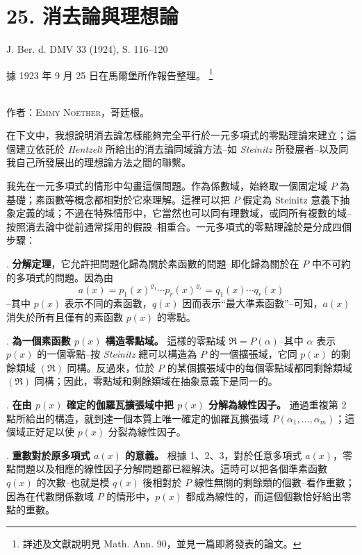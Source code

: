 \documentclass[11pt]{article}
\newcommand{\frakR}{\mathfrak R}
\newcommand{\srcfn}[2]{%
  \begingroup
  \renewcommand{\thefootnote}{#1}%
  \footnote{#2}%
  \addtocounter{footnote}{-1}%
  \endgroup}
\newcommand{\srcemph}[1]{\textbf{#1}}
\begin{document}
\section*{25. 消去論與理想論}

\begin{center}
J. Ber. d. DMV 33 (1924), S. 116--120
\end{center}

\setcounter{footnote}{0}

\begin{center}
據 1923 年 9 月 25 日在馬爾堡所作報告整理。\srcfn{1)}{詳述及文獻說明見 Math. Ann. 90，並見一篇即將發表的論文。}\\[0.5em]
作者：\textsc{Emmy Noether}，哥廷根。
\end{center}

在下文中，我想說明消去論怎樣能夠完全平行於一元多項式的零點理論來建立；這個建立依託於 \emph{Hentzelt} 所給出的消去論同域論方法--如 \emph{Steinitz} 所發展者--以及同我自己所發展出的理想論方法之間的聯繫。

我先在一元多項式的情形中勾畫這個問題。作為係數域，始終取一個固定域 $P$ 為基礎；素函數等概念都相對於它來理解。這裡可以把 $P$ 假定為 Steinitz 意義下抽象定義的域；不過在特殊情形中，它當然也可以同有理數域，或同所有複數的域--按照消去論中從前通常採用的假設--相重合。一元多項式的零點理論於是分成四個步驟：

. \srcemph{分解定理}，它允許把問題化歸為關於素函數的問題--即化歸為關於在 $P$ 中不可約的多項式的問題。因為由
\[
 a(x)=p_1(x)^{\varrho_1}\cdots p_r(x)^{\varrho_r}=q_1(x)\cdots q_r(x)
\]
--其中 $p(x)$ 表示不同的素函數，$q(x)$ 因而表示“最大準素函數”--可知，$a(x)$ 消失於所有且僅有的素函數 $p(x)$ 的零點。

. \srcemph{為一個素函數 $p(x)$ 構造零點域。} 這樣的零點域 $\frakR=P(\alpha)$--其中 $\alpha$ 表示 $p(x)$ 的一個零點--按 \emph{Steinitz} 總可以構造為 $P$ 的一個擴張域，它同 $p(x)$ 的剩餘類域 $(\frakR)$ 同構。反過來，位於 $P$ 的某個擴張域中的每個零點域都同剩餘類域 $(\frakR)$ 同構；因此，零點域和剩餘類域在抽象意義下是同一的。

. \srcemph{在由 $p(x)$ 確定的伽羅瓦擴張域中把 $p(x)$ 分解為線性因子。} 通過重複第 2 點所給出的構造，就到達一個本質上唯一確定的伽羅瓦擴張域 $P(\alpha_1,\ldots,\alpha_m)$；這個域正好足以使 $p(x)$ 分裂為線性因子。

. \srcemph{重數對於原多項式 $a(x)$ 的意義。} 根據 1、2、3，對於任意多項式 $a(x)$，零點問題以及相應的線性因子分解問題都已經解決。這時可以把各個準素函數 $q(x)$ 的次數--也就是模 $q(x)$ 後相對於 $P$ 線性無關的剩餘類的個數--看作重數；因為在代數閉係數域 $P$ 的情形中，$p(x)$ 都成為線性的，而這個個數恰好給出零點的重數。
\end{document}

